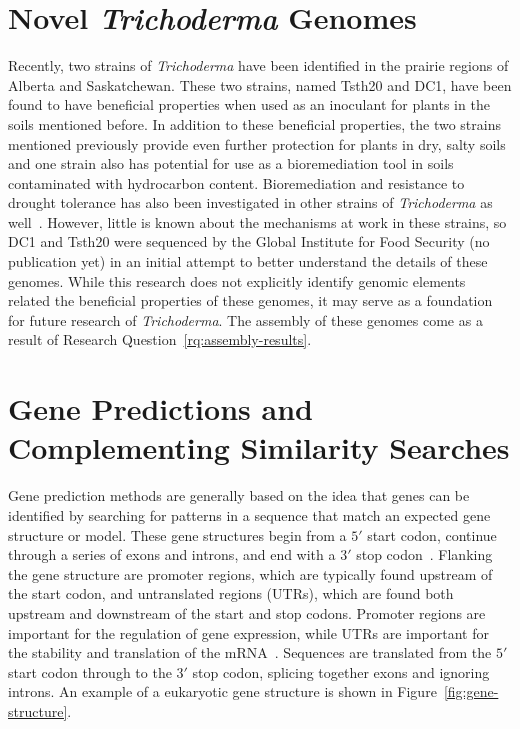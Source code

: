 \section{Novel \textit{Trichoderma} Genomes}
\label{lit:novel-genomes}
Recently, two strains of \textit{Trichoderma}
have been identified in the prairie regions of Alberta and
Saskatchewan. These two strains, named Tsth20 and DC1, have been found
to have beneficial properties when used as an inoculant for plants in
the soils mentioned before. In addition to these beneficial
properties, the two strains mentioned previously provide even further
protection for plants in dry, salty soils and one strain also has
potential for use as a bioremediation tool in soils contaminated with
hydrocarbon content. Bioremediation and resistance to drought
tolerance has also been investigated in other strains of
\textit{Trichoderma} as well~\cite{senizza2023}. However,
little is known about the mechanisms at work in these strains, so DC1
and Tsth20 were sequenced by the Global Institute for Food Security
(no publication yet) in an initial attempt to better understand the
details of these genomes. While this research does not explicitly
identify genomic elements related the beneficial properties of these
genomes, it may serve as a foundation for future research of
\textit{Trichoderma}. The assembly of these genomes come as a result of Research Question~\ref{rq:assembly-results}.

\section{Gene Predictions and Complementing Similarity Searches}
\label{lit:similarity-searches}
Gene prediction methods are generally based on the idea that genes can be
identified by searching for patterns in a sequence that match an expected gene structure or model. These gene structures begin from a $5'$ start codon, continue through a series of exons and introns, and end with a $3'$ stop codon~\cite{loftus2003a}. Flanking the gene structure are promoter regions, which are typically found upstream of the start codon, and untranslated regions (UTRs), which are found both upstream and downstream of the start and stop codons. Promoter regions are important for the regulation of gene expression, while UTRs are important for the stability and translation of the mRNA~\cite{loftus2003a}. Sequences are translated from the $5'$ start codon through to the $3'$ stop codon, splicing together exons and ignoring introns. An example of a eukaryotic gene structure is shown in Figure~\ref{fig:gene-structure}.

